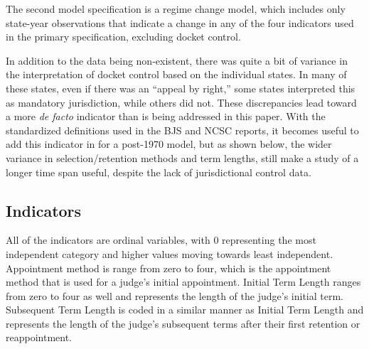 \documentclass[12pt]{article}
\begin{document}
The second model specification is a regime change model, which includes only state-year observations that indicate a change in any of the four indicators used in the primary specification, excluding docket control.  

In addition to the data being non-existent, there was quite a bit of variance in the interpretation of docket control based on the individual states.  In many of these states, even if there was an ``appeal by right,'' some states interpreted this as mandatory jurisdiction, while others did not.  These discrepancies lead toward a more \textit{de facto} indicator than is being addressed in this paper.  With the standardized definitions used in the BJS and NCSC reports, it becomes useful to add this indicator in for a post-1970 model, but as shown below, the wider variance in selection/retention methods and term lengths, still make a study of a longer time span useful, despite the lack of jurisdictional control data.  

\subsection{Indicators}
All of the indicators are ordinal variables, with 0 representing the most independent category and higher values moving towards least independent.  Appointment method is range from zero to four, which is the appointment method that is used for a judge's initial appointment.  Initial Term Length ranges from zero to four as well and represents the length of the judge's initial term.  Subsequent Term Length is coded in a similar manner as Initial Term Length and represents the length of the judge's subsequent terms after their first retention or reappointment. 
\end{document}
